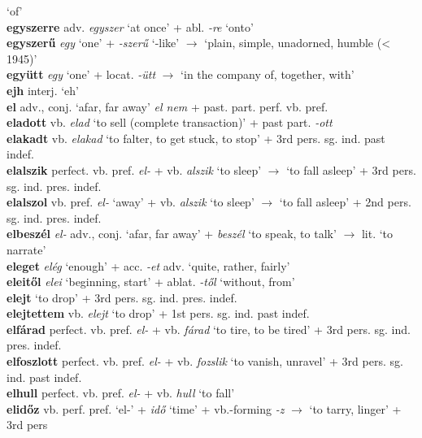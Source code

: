 \documentclass[11pt]{article}
\begin{document}
`of' \\
\textbf{egyszerre} adv. \emph{egyszer} `at once' +
  abl. \emph{-re} `onto' \\
\textbf{egyszerű} \emph{egy} `one' + \emph{-szerű} `-like'
$\rightarrow$ `plain, simple, unadorned, humble (< 1945)' \\
\textbf{együtt} \emph{egy} `one' + locat. \emph{-ütt} $\rightarrow$
`in the company of, together, with' \\
\textbf{ejh} interj. `eh' \\
\textbf{el} adv., conj. `afar, far away' \textbar\textbar{} \emph{el
nem} + past. part. \textbar\textbar{} perf. vb. pref. \\
\textbf{eladott} vb. \emph{elad} `to sell (complete transaction)' + past part. \emph{-ott} \\
\textbf{elakadt} vb. \emph{elakad} `to falter, to get stuck, to stop'
+ 3rd pers. sg. ind. past indef. \\
\textbf{elalszik} perfect. vb. pref. \emph{el-} + vb. \emph{alszik}
`to sleep' $\rightarrow$ `to fall asleep' + 3rd
pers. sg. ind. pres. indef. \\
\textbf{elalszol} vb. pref. \emph{el-} `away' + vb. \emph{alszik} `to
sleep' $\rightarrow$ `to fall asleep' + 2nd
pers. sg. ind. pres. indef. \\
\textbf{elbeszél} \emph{el-} adv., conj. `afar, far away'
+ \emph{beszél} `to speak, to talk' $\rightarrow$ lit. `to narrate' \\
\textbf{eleget} \emph{elég} `enough' +
acc. \emph{-et} \textbar\textbar{} adv. `quite, rather, fairly' \\
\textbf{eleitől} \emph{elei} `beginning, start' + ablat. \emph{-től} `without,
from' \\
\textbf{elejt} `to drop' + 3rd pers. sg. ind. pres. indef. \\
\textbf{elejtettem} vb. \emph{elejt} `to drop' + 1st
pers. sg. ind. past indef. \\
\textbf{elfárad} perfect. vb. pref. \emph{el-} + vb. \emph{fárad} `to
tire, to be tired' + 3rd pers. sg. ind. pres. indef. \\
\textbf{elfoszlott} perfect. vb. pref. \emph{el-} + vb. \emph{fozslik}
`to vanish, unravel' + 3rd pers. sg. ind. past indef. \\
\textbf{elhull} perfect. vb. pref. \emph{el-} + vb. \emph{hull} `to fall' \\
\textbf{elidőz} vb. perf. pref. `el-' + \emph{idő} `time' +
vb.-forming \emph{-z} $\rightarrow$ `to tarry, linger' + 3rd pers
\end{document}
